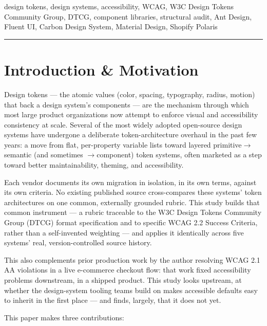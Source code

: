 \documentclass[11pt]{article}
\begin{document}
\vspace{0.6em}
 design tokens, design systems, accessibility, WCAG, W3C Design Tokens Community Group, DTCG, component libraries, structural audit, Ant Design, Fluent UI, Carbon Design System, Material Design, Shopify Polaris

\vspace{1em}
\noindent\rule{\textwidth}{0.5pt}

\section{Introduction \& Motivation}

Design tokens --- the atomic values (color, spacing, typography, radius, motion) that back a design system's components --- are the mechanism through which most large product organizations now attempt to enforce visual and accessibility consistency at scale. Several of the most widely adopted open-source design systems have undergone a deliberate token-architecture overhaul in the past few years: a move from flat, per-property variable lists toward layered primitive\(\to\)semantic (and sometimes \(\to\)component) token systems, often marketed as a step toward better maintainability, theming, and accessibility.

Each vendor documents its own migration in isolation, in its own terms, against its own criteria. No existing published source cross-compares these systems' token architectures on one common, externally grounded rubric. This study builds that common instrument --- a rubric traceable to the W3C Design Tokens Community Group (DTCG) format specification and to specific WCAG 2.2 Success Criteria, rather than a self-invented weighting --- and applies it identically across five systems' real, version-controlled source history.

This also complements prior production work by the author resolving WCAG 2.1 AA violations in a live e-commerce checkout flow: that work fixed accessibility problems downstream, in a shipped product. This study looks upstream, at whether the design-system tooling teams build on makes accessible defaults easy to inherit in the first place --- and finds, largely, that it does not yet.

This paper makes three contributions:
\end{document}

